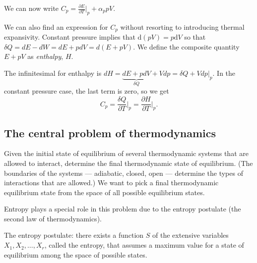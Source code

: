We can now write $C_p = \frac{\partial E}{\partial T}\vert_{p} + \alpha_p pV$. 


We can also find an expression for $C_p$ without resorting to introducing thermal expansivity. Constant pressure implies that $\mathrm{d}(pV)=p\mathrm{d}V$ so that $\delta Q = dE - dW = dE +pdV = d(E+pV)$. We define the composite quantity $E+pV$ as \emph{enthalpy}, $H$.

The infinitesimal for enthalpy is $dH = \underbrace{dE +pdV}_{\delta Q}+ Vdp = \delta Q + Vdp\vert_{p}$. In the constant pressure case, the last term is zero, so we get 
$$
	C_p = \frac{\delta Q}{\partial T}\bigg\vert_{p} = \frac{\partial H}{\partial T}\bigg\vert_{p}. 
$$




\subsection{The central problem of thermodynamics}
Given the initial state of equilibrium of several thermodynamic systems that are allowed to interact, determine the final thermodynamic state of equilibrium. (The boundaries of the systems --- adiabatic, closed, open --- determine the types of interactions that are allowed.) We want to pick a final thermodynamic equilibrium state from the space of all possible equilibrium states.

Entropy plays a special role in this problem due to the entropy postulate (the second law of thermodynamics).

The entropy postulate: there exists a function $S$ of the extensive variables $X_1,X_2,\ldots,X_r$, called the entropy, that assumes a maximum value for a state of equilibrium among the space of possible states.

